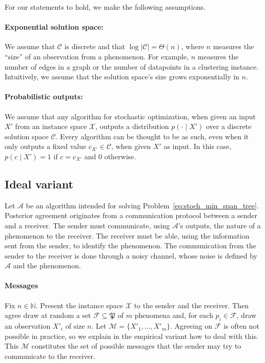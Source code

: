 For our statements to hold, we make the following assumptions.

\paragraph{Exponential solution space:} We assume that $\mathcal{C}$ is discrete and that $\log \left|\mathcal{C}\right| = \Theta(n)$, where $n$ measures the ``size'' of an observation from a phenomenon. For example, $n$ measures the number of edges in a graph or the number of datapoints in a clustering instance. Intuitively, we assume that the solution space's size grows exponentially in $n$.

\paragraph{Probabilistic outputs:} We assume that any algorithm for stochastic optimization, when given an input $X'$ from an instance space $\mathcal{X}$, outputs a distribution $p(\cdot \mid X')$ over a discrete solution space $\mathcal{C}$. Every algorithm can be thought to be as such, even when it only outputs a fixed value $c_{X'} \in \mathcal{C}$, when given $X'$ as input. In this case, $p(c \mid X') = 1$ if $c = c_{X'}$ and $0$ otherwise.

\subsection{Ideal variant}

Let $\mathcal{A}$ be an algorithm intended for solving Problem~\ref{eq:stoch_min_span_tree}. Posterior agreement originates from a communication protocol between a sender and a receiver. The sender must communicate, using $\mathcal{A}$'s outputs, the nature of a phenomenon to the receiver. The receiver must be able, using the information sent from the sender, to identify the phenomenon. The communication from the sender to the receiver is done through a noisy channel, whose noise is defined by $\mathcal{A}$ and the phenomenon.

\paragraph{Messages} Fix $n \in \mathbb{N}$. Present the instance space $\mathcal{X}$ to the sender and the receiver. Then agree draw at random a set $\mathcal{F} \subseteq \mathfrak{P}$ of $m$ phenomena and, for each $p_i \in \mathcal{F}$, draw an observation $X'_i$ of size $n$. Let $\mathcal{M} = \{X'_1, \ldots, X'_m\}$. Agreeing on $\mathcal{F}$ is often not possible in practice, so we explain in the empirical variant how to deal with this. This $\mathcal{M}$ constitutes the set of possible messages that the sender may try to communicate to the receiver.

